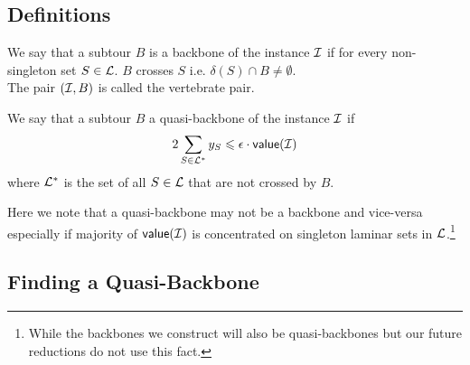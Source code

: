 \documentclass[./main.tex]{subfiles}
\begin{document}
	\subsection{Definitions}

	\begin{definition}
		We say that a subtour $B$ is a backbone of the instance $\mathcal{I}$ if for every non-singleton set $S \in \mathcal{L}$. $B$ crosses $S$ i.e. $\delta(S) \cap B \ne \emptyset$.\\
		The pair $(\mathcal{I}, B)$ is called the vertebrate pair.\\
	\end{definition}

	\begin{definition}
		We say that a subtour $B$ a quasi-backbone of the instance $\mathcal{I}$ if
		\begin{equation}\label{def:6:q-bb}
			2\sum_{S \in \mathcal{L}^*} y_S \leqslant \epsilon\cdot\textsf{\textup{value}}(\mathcal{I})
		\end{equation}
		where $\mathcal{L}^*$ is the set of all $S \in \mathcal{L}$ that are not crossed by $B$.
	\end{definition}

	Here we note that a quasi-backbone may not be a backbone and vice-versa especially if majority of $\textsf{\textup{value}}(\mathcal{I})$ is concentrated on singleton laminar sets in $\mathcal{L}$.\footnote{While the backbones we construct will also be quasi-backbones but our future reductions do not use this fact.}

	\subsection{Finding a Quasi-Backbone}
\end{document}
